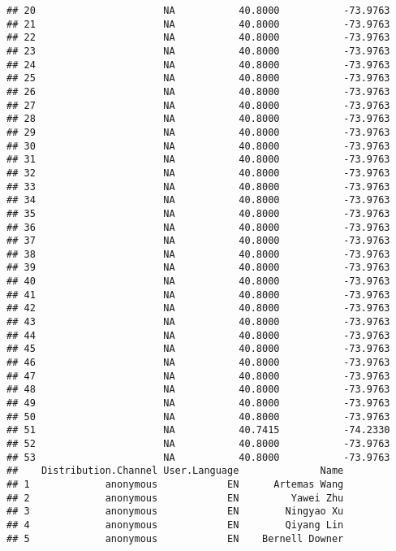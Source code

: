 \documentclass[]{article}
\begin{document}
\begin{verbatim}
## 20                      NA           40.8000           -73.9763
## 21                      NA           40.8000           -73.9763
## 22                      NA           40.8000           -73.9763
## 23                      NA           40.8000           -73.9763
## 24                      NA           40.8000           -73.9763
## 25                      NA           40.8000           -73.9763
## 26                      NA           40.8000           -73.9763
## 27                      NA           40.8000           -73.9763
## 28                      NA           40.8000           -73.9763
## 29                      NA           40.8000           -73.9763
## 30                      NA           40.8000           -73.9763
## 31                      NA           40.8000           -73.9763
## 32                      NA           40.8000           -73.9763
## 33                      NA           40.8000           -73.9763
## 34                      NA           40.8000           -73.9763
## 35                      NA           40.8000           -73.9763
## 36                      NA           40.8000           -73.9763
## 37                      NA           40.8000           -73.9763
## 38                      NA           40.8000           -73.9763
## 39                      NA           40.8000           -73.9763
## 40                      NA           40.8000           -73.9763
## 41                      NA           40.8000           -73.9763
## 42                      NA           40.8000           -73.9763
## 43                      NA           40.8000           -73.9763
## 44                      NA           40.8000           -73.9763
## 45                      NA           40.8000           -73.9763
## 46                      NA           40.8000           -73.9763
## 47                      NA           40.8000           -73.9763
## 48                      NA           40.8000           -73.9763
## 49                      NA           40.8000           -73.9763
## 50                      NA           40.8000           -73.9763
## 51                      NA           40.7415           -74.2330
## 52                      NA           40.8000           -73.9763
## 53                      NA           40.8000           -73.9763
##    Distribution.Channel User.Language              Name
## 1             anonymous            EN      Artemas Wang
## 2             anonymous            EN         Yawei Zhu
## 3             anonymous            EN        Ningyao Xu
## 4             anonymous            EN        Qiyang Lin
## 5             anonymous            EN    Bernell Downer

\end{verbatim}
\end{document}
